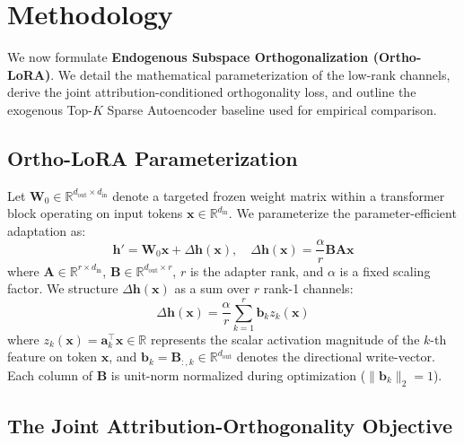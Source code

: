 \documentclass[10pt,twocolumn,letterpaper]{article}
\begin{document}
\section{Methodology}
\label{sec:methodology}

We now formulate \textbf{Endogenous Subspace Orthogonalization (Ortho-LoRA)}. We detail the mathematical parameterization of the low-rank channels, derive the joint attribution-conditioned orthogonality loss, and outline the exogenous Top-$K$ Sparse Autoencoder baseline used for empirical comparison.

\subsection{Ortho-LoRA Parameterization}
\label{subsec:ortho_lora_param}

Let $\bm{W}_0 \in \mathbb{R}^{d_{\text{out}} \times d_{\text{in}}}$ denote a targeted frozen weight matrix within a transformer block operating on input tokens $\bm{x} \in \mathbb{R}^{d_{\text{in}}}$. We parameterize the parameter-efficient adaptation as:
\begin{equation}
    \bm{h}' = \bm{W}_0 \bm{x} + \Delta \bm{h}(\bm{x}), \quad \Delta \bm{h}(\bm{x}) = \frac{\alpha}{r} \bm{B}\bm{A}\bm{x}
\end{equation}
where $\bm{A} \in \mathbb{R}^{r \times d_{\text{in}}}$, $\bm{B} \in \mathbb{R}^{d_{\text{out}} \times r}$, $r$ is the adapter rank, and $\alpha$ is a fixed scaling factor. We structure $\Delta \bm{h}(\bm{x})$ as a sum over $r$ rank-1 channels:
\begin{equation}
    \Delta \bm{h}(\bm{x}) = \frac{\alpha}{r} \sum_{k=1}^r \bm{b}_k z_k(\bm{x})
    \label{eq:channel_sum}
\end{equation}
where $z_k(\bm{x}) = \bm{a}_k^\top \bm{x} \in \mathbb{R}$ represents the scalar activation magnitude of the $k$-th feature on token $\bm{x}$, and $\bm{b}_k = \bm{B}_{:, k} \in \mathbb{R}^{d_{\text{out}}}$ denotes the directional write-vector. Each column of $\bm{B}$ is unit-norm normalized during optimization ($\|\bm{b}_k\|_2 = 1$).

\subsection{The Joint Attribution-Orthogonality Objective}
\label{subsec:joint_loss}
\end{document}

